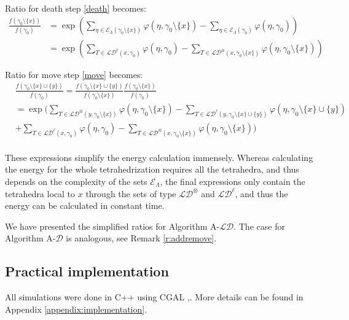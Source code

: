Ratio for death step \eqref{death} becomes:
\begin{align*}
\frac{f(\gamma_0 \setminus\{x\})}{f(\gamma_0)}&= \exp\left({\sum_{\eta\in \mathcal E_\Lambda(\gamma_0 \setminus\{x\})} \varphi(\eta,\gamma_0 \setminus\{x\})- \sum_{\eta\in \mathcal E_\Lambda(\gamma_0)}\varphi(\eta,\gamma_0)}\right)\\
&= \exp\left( \sum_{T\in \mathcal {LD}^\ell (x,\gamma_0)} \varphi(\eta,\gamma_0) - \sum_{T \in \mathcal {LD}^\otimes (x,\gamma_0 \setminus\{x\} )} \varphi(\eta,\gamma_0 \setminus\{x\})   \right)
\end{align*}

Ratio for move step \eqref{move} becomes:
\begin{align*}
& \frac{f(\gamma_0 \setminus\{x\} \cup\{y\})}{f(\gamma_0)}= 
\frac{f(\gamma_0 \setminus\{x\} \cup\{y\})}{f(\gamma_0 \setminus\{x\})} \frac{f(\gamma_0 \setminus\{x\})}{f(\gamma_0)} \\ 
&= \exp \Bigg(  \sum_{T \in \mathcal {LD}^\otimes (y,\gamma_0 \setminus\{x\})} \varphi(\eta,\gamma_0 \setminus\{x\})  - \sum_{T\in \mathcal {LD}^\ell (y,\gamma_0 \setminus\{x\} \cup\{y\})} \varphi(\eta,\gamma_0 \setminus\{x\} \cup\{y\})  \\
&+ \sum_{T\in \mathcal {LD}^\ell (x,\gamma_0)} \varphi(\eta,\gamma_0) - \sum_{T \in \mathcal {LD}^\otimes (x,\gamma_0 \setminus\{x\})} \varphi(\eta,\gamma_0 \setminus\{x\}) \Bigg) \\
\end{align*}


These expressions simplify the energy calculation immensely. Whereas calculating the energy for the whole tetrahedrization requires all the tetrahedra, and thus depends on the complexity of the sets $\mathcal E_\Lambda$, the final expressions only contain the tetrahedra local to $x$ through the sets of type $\mathcal {LD}^\otimes$ and $\mathcal {LD}^\ell$, and thus the energy can be calculated in constant time.

We have presented the simplified ratios for Algorithm A-$\mathcal {LD}$. The case for Algorithm A-$\mathcal D$ is analogous, see Remark \ref{r:addremove}.

\subsection{Practical implementation}\label{sec:practical}
All simulations were done in C++ using CGAL \cite{cgal},\cite{cgal:3d-triang}. More details can be found in Appendix \ref{appendix:implementation}.
